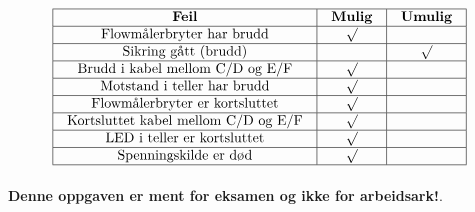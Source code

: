 $$\vbox{\offinterlineskip
\halign{\strut
\vrule \quad\hfil # \ \hfil & 
\vrule \quad\hfil # \ \hfil & 
\vrule \quad\hfil # \ \hfil \vrule \cr
\noalign{\hrule}
%
{\bf Feil} & {\bf Mulig} & {\bf Umulig} \cr
%
\noalign{\hrule}
%
Flowmålerbryter har brudd & $\surd$ &  \cr
%
\noalign{\hrule}
%
Sikring gått (brudd) &  & $\surd$ \cr
%
\noalign{\hrule}
%
Brudd i kabel mellom C/D og E/F & $\surd$ &  \cr
%
\noalign{\hrule}
%
Motstand i teller har brudd & $\surd$ &  \cr
%
\noalign{\hrule}
%
Flowmålerbryter er kortsluttet & $\surd$ &  \cr
%
\noalign{\hrule}
%
Kortsluttet kabel mellom C/D og E/F & $\surd$ &  \cr
%
\noalign{\hrule}
%
LED i teller er kortsluttet & $\surd$ &  \cr
%
\noalign{\hrule}
%
Spenningskilde er død & $\surd$ &  \cr
%
\noalign{\hrule}
} %
}$$ %








{\bf Denne oppgaven er ment for eksamen og ikke for arbeidsark!}.

